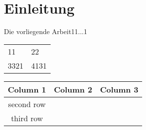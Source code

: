 \chapter{Einleitung}
\label{chap:Einleitung}


Die vorliegende Arbeit11...1

\begin{tabular}{|ll|}
\hline
11   & 22   \\
3321 & 4131 \\
\hline
\end{tabular}

 
\begin{tabular}{|c|c|c|}
        \hline
        Column 1 & Column 2 & Column 3 \\
        \hline
        second row & & \\
        \hline
        third row & & \\
        \hline
\end{tabular}



